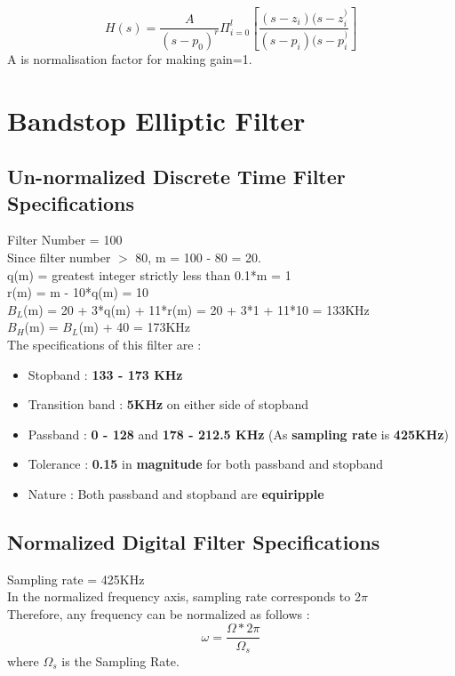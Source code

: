 \documentclass{article}
\begin{document}
\begin{equation}
    H(s) = \frac{A}{(s-p_0)^r}\Pi_{i=0}^l\left[\frac{(s-z_i)(s-z_i^)}{(s-p_i)(s-p_i^)}\right]
\end{equation}
A is normalisation factor for making gain=1.

\section{\textbf{Bandstop Elliptic Filter}}
\subsection{\textbf{Un-normalized Discrete Time Filter Specifications}}
Filter Number = 100\\
Since filter number $>$ 80, m = 100 - 80 = 20.\\
q(m) = greatest integer strictly less than 0.1*m = 1\\
r(m) = m - 10*q(m) = 10\\
$B_L$(m) = 20 + 3*q(m) + 11*r(m) = 20 + 3*1 + 11*10 = 133KHz \\
$B_H$(m) = $B_L$(m) + 40 = 173KHz\\

\vspace{1.5em}
\noindent
The specifications of this filter are :
\begin{itemize}
    \item Stopband : \textbf{133 - 173 KHz}
    \item  Transition band : \textbf{5KHz} on either side of stopband
    \item Passband : \textbf{0 - 128} and \textbf{178 - 212.5 KHz} (As \textbf{sampling rate} is \textbf{425KHz})

    \item  Tolerance : \textbf{0.15} in \textbf{magnitude} for both passband and stopband
    \item  Nature : Both passband and stopband are \textbf{equiripple}
\end{itemize}

\subsection{Normalized Digital Filter Specifications}
Sampling rate = 425KHz\\
In the normalized frequency axis, sampling rate corresponds to 2$\pi$\\
Therefore, any frequency can be normalized as follows :
\begin{equation*}
    \omega = \frac{\Omega*2\pi}{\Omega_s}
\end{equation*}
where $\Omega_s$ is the Sampling Rate.\\
\end{document}
